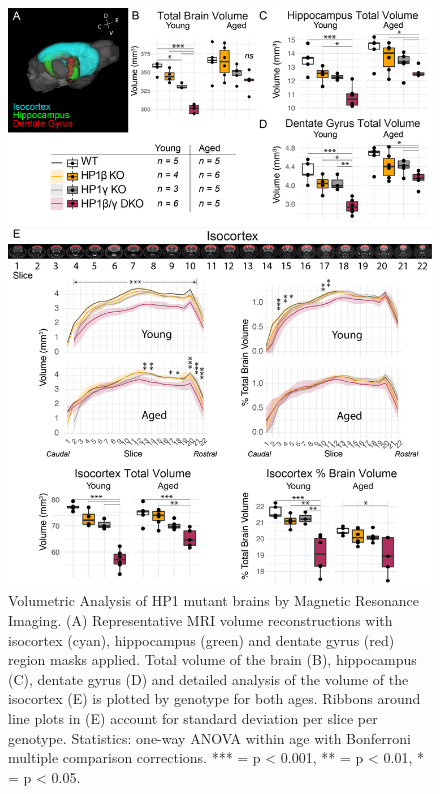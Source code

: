 \documentclass[onehalf,12pt]{beavtex}
\begin{document}
  \begin{figure}
  
  {\centering \includegraphics[width=1\linewidth, ]{./figure/results/_MRI} 
  
  }
  
  \caption[Volumetric Analysis of HP1 mutant brains by Magnetic Resonance Imaging]{Volumetric Analysis of HP1 mutant brains by Magnetic Resonance Imaging. (A) Representative MRI volume reconstructions with isocortex (cyan), hippocampus (green) and dentate gyrus (red) region masks applied. Total volume of the brain (B), hippocampus (C), dentate gyrus (D) and detailed analysis of the volume of the isocortex (E) is plotted by genotype for both ages. Ribbons around line plots in (E) account for standard deviation per slice per genotype. Statistics: one-way ANOVA within age with Bonferroni multiple comparison corrections. *** = p < 0.001, ** = p < 0.01, * = p < 0.05.}\label{fig:MRIresults}
  \end{figure}
  
\end{document}

